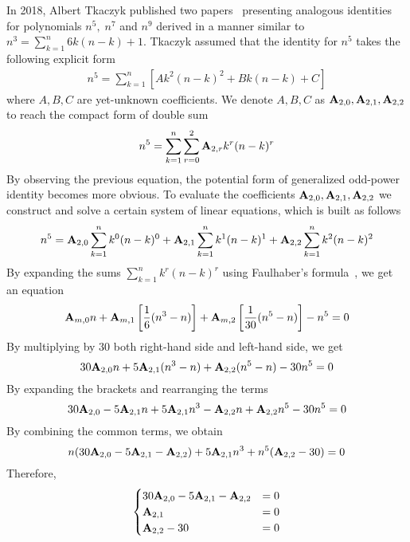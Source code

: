 In 2018, Albert Tkaczyk published two papers~\cite{tkaczyk2018problem, tkaczyk2018continuation}
presenting analogous identities for polynomials $n^5, \; n^7$ and $n^9$
derived in a manner similar to $n^3 = \sum_{k=1}^{n} 6k(n-k) + 1$.
Tkaczyk assumed that the identity for $n^5$ takes the following explicit form
\begin{align*}
    n^5 = \sum_{k=1}^{n} \left[ A k^2(n-k)^2 + Bk(n-k) + C \right]
\end{align*}
where $A,B,C$ are yet-unknown coefficients.
We denote $A,B,C$ as ${\mathbf{A}} \sb{2,0}, {\mathbf{A}} \sb{2,1}, {\mathbf{A}} \sb{2,2}$
to reach the compact form of double sum
\begin{align*}
    n^5 = \sum_{k=1}^{n} \sum_{r=0}^{2} {\mathbf{A}} \sb{2,r} k^r (n-k)^r
\end{align*}
By observing the previous equation, the potential form of generalized odd-power identity becomes more obvious.
To evaluate the coefficients ${\mathbf{A}} \sb{2,0}, {\mathbf{A}} \sb{2,1}, {\mathbf{A}} \sb{2,2}$
we construct and solve a certain system of linear equations, which is
built as follows
\begin{align*}
    n^5 = {\mathbf{A}} \sb{2,0} \sum_{k=1}^{n} k^0 (n-k)^0 + {\mathbf{A}} \sb{2,1} \sum_{k=1}^{n} k^1 (n-k)^1 + {\mathbf{A}} \sb{2,2} \sum_{k=1}^{n} k^2 (n-k)^2
\end{align*}
By expanding the sums $\sum_{k=1}^{n} k^r (n-k)^r$ using Faulhaber's formula~\cite{beardon1996sums}, we get
an equation
\begin{equation*}
    {\mathbf{A}} \sb{m,0} n
    + {\mathbf{A}} \sb{m,1} \left[ \frac{1}{6} (n^3-n) \right]
    + {\mathbf{A}} \sb{m,2} \left[ \frac{1}{30} (n^5-n) \right] - n^5 = 0
\end{equation*}
By multiplying by $30$ both right-hand side and left-hand side, we get
\begin{equation*}
    30 {\mathbf{A}} \sb{2,0} n + 5 {\mathbf{A}} \sb{2,1} (n^3-n) + {\mathbf{A}} \sb{2,2} (n^5-n) - 30n^5 = 0
\end{equation*}
By expanding the brackets and rearranging the terms
\begin{equation*}
    30 {\mathbf{A}} \sb{2,0} - 5 {\mathbf{A}} \sb{2,1} n + 5 {\mathbf{A}} \sb{2,1} n^3 - {\mathbf{A}} \sb{2,2} n + {\mathbf{A}} \sb{2,2} n^5 - 30n^5 = 0
\end{equation*}
By combining the common terms, we obtain
\begin{equation*}
    n (30 {\mathbf{A}} \sb{2,0} - 5 {\mathbf{A}} \sb{2,1} - {\mathbf{A}} \sb{2,2}) + 5 {\mathbf{A}} \sb{2,1} n^3 + n^5 ({\mathbf{A}} \sb{2,2} - 30) = 0
\end{equation*}
Therefore,
\begin{equation*}
    \begin{cases}
        30 {\mathbf{A}} \sb{2,0} - 5 {\mathbf{A}} \sb{2,1} - {\mathbf{A}} \sb{2,2} &= 0 \\
        {\mathbf{A}} \sb{2,1} &= 0 \\
        {\mathbf{A}} \sb{2,2} - 30 &= 0
    \end{cases}
\end{equation*}

